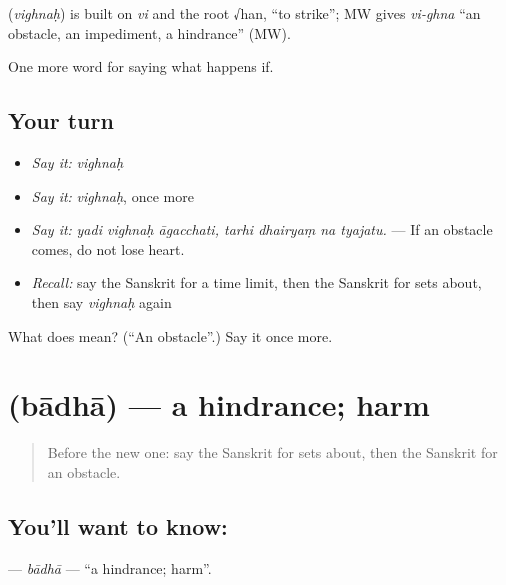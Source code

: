 \begin{cousinweb}
\textbf{} (\emph{vighnaḥ}) is built on \emph{vi} and the root √han, \textquotedblleft{}to strike\textquotedblright{}; MW gives \emph{vi-ghna} \textquotedblleft{}an obstacle, an impediment, a hindrance\textquotedblright{} (MW).
\end{cousinweb}

\begin{grammarlens}[title={What you've built}]
One more word for saying what happens if.
\end{grammarlens}

\subsection*{Your turn}
\begin{itemize}
\raggedright
  \item \emph{Say it:} \emph{vighnaḥ}
  \item \emph{Say it:} \emph{vighnaḥ}, once more
  \item \emph{Say it:} \emph{yadi vighnaḥ āgacchati, tarhi dhairyaṃ na tyajatu.} — If an obstacle comes, do not lose heart.
  \item \emph{Recall:} say the Sanskrit for a time limit, then the Sanskrit for sets about, then say \emph{vighnaḥ} again
\end{itemize}

\begin{tcolorbox}[breakable,colback=teal!4,colframe=teal!35!black,title={Before you move on}]
What does  mean? (\textquotedblleft{}An obstacle\textquotedblright{}.) Say it once more.
\end{tcolorbox}
\section[\texorpdfstring{\sk{बाधा} (bādhā)}{बाधा (bādhā)}]{ (bādhā) — a hindrance; harm}

\label{lesson:SA-C372-badha}



\begin{quote}
Before the new one: say the Sanskrit for sets about, then the Sanskrit for an obstacle.
\end{quote}

\subsection*{You'll want to know: }
\textbf{} — \emph{bādhā} — \textquotedblleft{}a hindrance; harm\textquotedblright{}.

